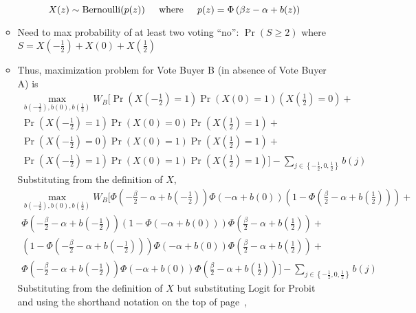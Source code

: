 \documentclass[12pt]{article}
\begin{document}
\begin{itemize}
\begin{itemize}
				\[
				  X(z) \sim \text{Bernoulli}(p(z)) \hskip.2in \text{where} \hskip.2in p(z) = \Phi\left(\beta z - \alpha + b(z) \right)
				\]
			\item Need to max probability of at least two voting ``no'': $\Pr(S \geq 2)$ where $S = X\left(-\frac{1}{2}\right) + X\left(0\right) + X\left(\frac{1}{2}\right)$
			\item Thus, maximization problem for Vote Buyer B (in absence of Vote Buyer A) is
			  \begin{multline}
			    \max_{b\left(-\frac{1}{2}\right), b\left(0\right), b\left(\frac{1}{2}\right)} 
					W_B \biggl[ \Pr\left(X\left(-\frac{1}{2}\right)=1\right)\Pr\left(X\left(0\right)=1\right)\left(X\left(\frac{1}{2}\right)=0\right)  + \\
					\Pr\left(X\left(-\frac{1}{2}\right)=1\right)\Pr\left(X\left(0\right)=0\right)\Pr\left(X\left(\frac{1}{2}\right)=1\right) + \\
					\Pr\left(X\left(-\frac{1}{2}\right)=0\right)\Pr\left(X\left(0\right)=1\right)\Pr\left(X\left(\frac{1}{2}\right)=1\right) + \\
					\Pr\left(X\left(-\frac{1}{2}\right)=1\right)\Pr\left(X\left(0\right)=1\right)\Pr\left(X\left(\frac{1}{2}\right)=1\right) \biggr] - \sum_{j\in \left\{-\frac{1}{2}, 0,\frac{1}{2}\right\}} b(j)
				\end{multline}
			Substituting from the definition of $X$,
			  \begin{multline}
			    \max_{b\left(-\frac{1}{2}\right), b\left(0\right), b\left(\frac{1}{2}\right)} 
					W_B \biggl[ \Phi\left(-\frac{\beta}{2} - \alpha + b(-\frac{1}{2}) \right)\Phi\left(- \alpha + b(0) \right)\left(1-\Phi\left(\frac{\beta}{2} - \alpha + b(\frac{1}{2}) \right)\right)  + \\
					\Phi\left(-\frac{\beta}{2} - \alpha + b(-\frac{1}{2}) \right)\left(1-\Phi\left(- \alpha + b(0) \right)\right)\Phi\left(\frac{\beta}{2} - \alpha + b(\frac{1}{2}) \right) + \\
					\left(1-\Phi\left(-\frac{\beta}{2} - \alpha + b(-\frac{1}{2}) \right)\right)\Phi\left(- \alpha + b(0) \right)\Phi\left(\frac{\beta}{2} - \alpha + b(\frac{1}{2}) \right) + \\
					\Phi\left(-\frac{\beta}{2} - \alpha + b(-\frac{1}{2}) \right)\Phi\left(- \alpha + b(0) \right)\Phi\left(\frac{\beta}{2} - \alpha + b(\frac{1}{2}) \right) \biggr] - \sum_{j\in \left\{-\frac{1}{2}, 0,\frac{1}{2}\right\}} b(j)
				\end{multline}
			Substituting from the definition of $X$ but substituting Logit for Probit and using the shorthand notation on the top of page~\pageref{page:sh},

\end{itemize}
\end{itemize}
\end{document}
